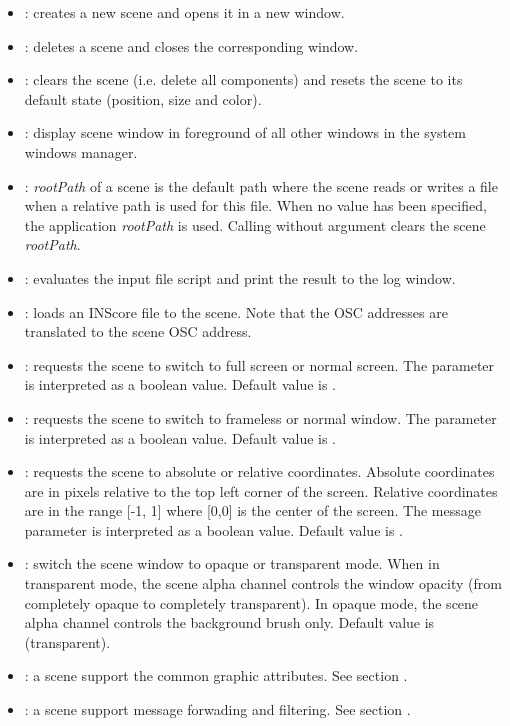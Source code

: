 \documentclass[a4paper,twoside]{report}
\begin{document}
\begin{itemize}
\item {}: creates a new scene and opens it in a new window.
\item {}: deletes a scene and closes the corresponding window.
\item {}: clears the scene (i.e. delete all components) and resets the scene to its default state (position, size and color).
\item {}: display scene window in foreground of all other windows in the system windows manager.
\item {}: \emph{rootPath} of a scene is the default path where the scene reads or writes a file when a relative path is used for this file. When no value has been specified, the application  \emph{rootPath} is used. Calling  without argument clears the scene \emph{rootPath}.
\item {}: evaluates the input file script and print the result to the log window.
\item {}: loads an INScore file to the scene. Note that the OSC addresses are translated to the scene OSC address.
\item {}: requests the scene to switch to full screen or normal screen.  The parameter is interpreted as a boolean value. Default value is .
\item {}: requests the scene to switch to frameless or normal window.  The parameter is interpreted as a boolean value. Default value is .
\item {}: requests the scene to absolute or relative coordinates. Absolute coordinates are in pixels relative to the top left corner of the screen. Relative coordinates are in the range [-1, 1] where [0,0] is the center of the screen. The message parameter is interpreted as a boolean value. Default value is .
\item {}: switch the scene window to opaque or transparent mode. When in transparent mode, the scene alpha channel controls the window opacity (from completely opaque to completely transparent). In opaque mode, the scene alpha channel controls the background brush only. Default value is  (transparent).
\item {}: a scene support the common graphic attributes. See section .
\item {}: a scene support message forwading and filtering. See section .
\end{itemize}
\end{document}
